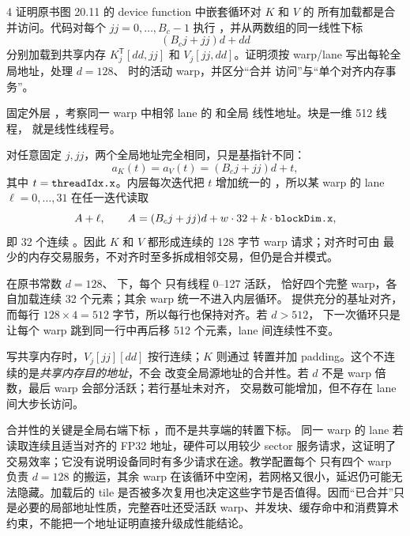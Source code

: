 \begin{solutionexercise}{4}
\problemheading 证明原书图 20.11 的 device function 中嵌套循环对 $K$ 和 $V$ 的
所有加载都是合并访问。代码对每个 $jj=0,\ldots,B_c-1$ 执行
，并从两数组的同一线性下标
\[
  (B_cj+jj)d+dd
\]
分别加载到共享内存 $K_j^{\mathsf T}[dd,jj]$ 和 $V_j[jj,dd]$。证明须按 warp/lane
写出每轮全局地址，处理 $d=128$、 时的活动 warp，并区分“合并
访问”与“单个对齐内存事务”。

\approachheading 固定外层 ，考察同一 warp 中相邻 lane 的  和全局
线性地址。块是一维 512 线程， 就是线性线程号。

\answerheading 对任意固定 $j,jj$，两个全局地址完全相同，只是基指针不同：
\[
 a_K(t)=a_V(t)=(B_cj+jj)d+t,
\]
其中 $t=\code{threadIdx.x}$。内层每次迭代把 $t$ 增加统一的
，所以某 warp 的 lane $\ell=0,\ldots,31$ 在任一迭代读取
\[
  A+\ell,\qquad A=(B_cj+jj)d+w\cdot32+k\cdot\code{blockDim.x},
\]
即 32 个连续 。因此 $K$ 和 $V$ 都形成连续的 128 字节 warp 请求；对齐时可由
最少的内存交易服务，不对齐时至多拆成相邻交易，但仍是合并模式。

在原书常数 $d=128$、 下，每个  只有线程 0--127 活跃，
恰好四个完整 warp，各自加载连续 32 个元素；其余 warp 统一不进入内层循环。
提供充分的基址对齐，而每行 $128\times4=512$ 字节，所以每行也保持对齐。若 $d>512$，
下一次循环只是让每个 warp 跳到同一行中再后移 512 个元素，lane 间连续性不变。

写共享内存时，$V_j[jj][dd]$ 按行连续；$K$ 则通过
 转置并加 padding。这个不连续的是\emph{共享内存目的地址}，不会
改变全局源地址的合并性。若 $d$ 不是 warp 倍数，最后 warp 会部分活跃；若行基址未对齐，
交易数可能增加，但不存在 lane 间大步长访问。

\conclusionheading 合并性的关键是全局右端下标 ，而不是共享端的转置下标。
\discussionheading
{}
同一 warp 的 lane 若读取连续且适当对齐的 FP32 地址，硬件可以用较少 sector 服务请求，这证明了交易效率；它没有说明设备同时有多少请求在途。教学配置每个  只有四个 warp 负责 $d=128$ 的搬运，其余 warp 在该循环中空闲，若网格又很小，延迟仍可能无法隐藏。加载后的 tile 是否被多次复用也决定这些字节是否值得。因而“已合并”只是必要的局部地址性质，完整吞吐还受活跃 warp、并发块、缓存命中和消费算术约束，不能把一个地址证明直接升级成性能结论。


\end{solutionexercise}
